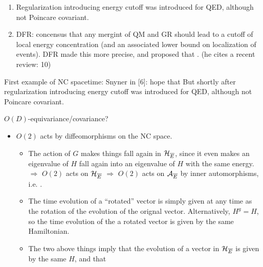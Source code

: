 {\begin{enumerate}
            \item Regularization introducing energy cutoff was introduced for QED, although not Poincare covariant.
            
            \item DFR: concensus that any mergint of QM and GR should lead to a cutoff of local energy concentration (and an associated lower bound on localization of events). DFR made this more precise, and proposed that . (he cites a recent review: 10)
            
            \end{enumerate}
    
    \lin 
    
    \cite{FioreTheCase2020} First example of NC spacetime: Snyner in [6]: hope that  But shortly after regularization introducing energy cutoff was introduced for QED, although not Poincare covariant.
    
    
    \lin   
    
    $O(D)$-equivariance/covariance?
    
        \begin{itemize}
            
        \item {} $O(2)$ acts by diffeomorphisms on the NC space.
            
            \begin{itemize}
                
            \item The action of $G$ makes things fall again in $\mathcal H_{\overline{E}}$, since it even makes an eigenvalue of $H$ fall again into an eigenvalue of $H$ with the same energy.
$\Rightarrow$ $O(2)$ acts on $\mathcal H_{\overline{E}}$ $\Rightarrow$ $O(2)$ acts on $\mathcal A_{\overline{E}}$ by inner automorphisms, i.e. .    
            \item The time evolution of a ``rotated'' vector is simply given at any time as the rotation of the evolution of the orignal vector. Alternatively, $H^g = H$, so the time evolution of the a rotated vector is given by the same Hamiltonian.
            
            \item The two above things imply that the evolution of a vector in $\mathcal H_{\overline{E}}$ is given by the same $H$, and that 
            

\end{itemize}
\end{itemize}}
